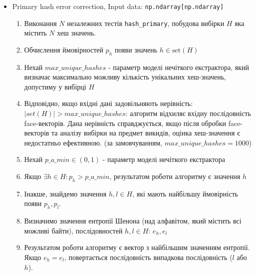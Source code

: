 \documentclass[11pt]{article}
\providecommand{\tightlist}{%
      \setlength{\itemsep}{0pt}\setlength{\parskip}{0pt}}
\def\gt{>}
\begin{document}
    \begin{itemize}
\tightlist
\item
  Primary hash error correction, Input data:
  \texttt{np.ndarray{[}np.ndarray{]}}

  \begin{enumerate}
  \def\labelenumi{\arabic{enumi}.}
  \tightlist
  \item
    Виконання \(N\) незалежних тестів \texttt{hash\_primary}, побудова
    вибірки \(H\) яка містить \(N\) хеш значень.
  \item
    Обчислення ймовірностей \(p_h\) появи значень
    \(h \in \text{set}(H)\)
  \item
    Нехай \(max\_unique\_hashes\) - параметр моделі нечіткого
    екстрактора, який визначає максимально можливу кількість унікальних
    хеш-значень, допустиму у вибірці \(H\)
  \item
    Відповідно, якщо вхідні дані задовільняють нерівність:
    \(|set(H)| \gt max\_unique\_hashes\): алгоритм відхиляє вхідну
    послідовність face-векторів. Дана нерівність справджується, якщо
    після обробки face-векторів та аналізу вибірки на предмет викидів,
    оцінка хеш-значення є недостатньо ефективною. (за замовчуванням,
    \(max\_unique\_hashes = 1000\))
  \item
    Нехай \(p\_a\_min \in (0,1)\) - параметр моделі нечіткого
    екстрактора
  \item
    Якщо \(\exists h \in H: p_h>p\_a\_min\), результатом роботи
    алгоритму є значення \(h\)
  \item
    Інакше, знайдемо значення \(h,l \in H\), які мають найбільшу
    ймовірність появи \(p_h,p_l\).
  \item
    Визначимо значення ентропії Шенона (над алфавітом, який містить всі
    можливі байти), послідовностей \(h,l \in H\): \(e_h, e_l\)
  \item
    Результатом роботи алгоритму є вектор з найбільшим значенням
    ентропії. Якщо \(e_h = e_l\), повертається послідовність випадкова
    послідовність (\(l\) або \(h\)).
  \end{enumerate}
\end{itemize}
\end{document}

